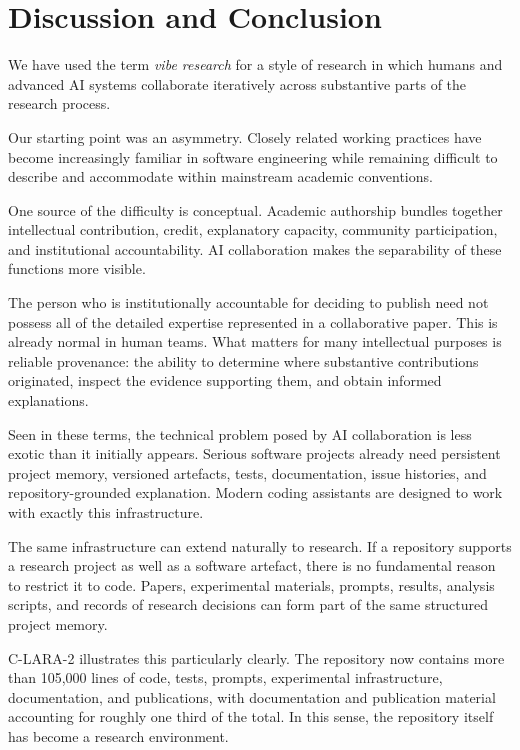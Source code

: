 \section{Discussion and Conclusion}

We have used the term \emph{vibe research} for a style of research in which humans and advanced AI systems collaborate iteratively across substantive parts of the research process.

Our starting point was an asymmetry. Closely related working practices have become increasingly familiar in software engineering while remaining difficult to describe and accommodate within mainstream academic conventions.

One source of the difficulty is conceptual. Academic authorship bundles together intellectual contribution, credit, explanatory capacity, community participation, and institutional accountability. AI collaboration makes the separability of these functions more visible.

The person who is institutionally accountable for deciding to publish need not possess all of the detailed expertise represented in a collaborative paper. This is already normal in human teams. What matters for many intellectual purposes is reliable provenance: the ability to determine where substantive contributions originated, inspect the evidence supporting them, and obtain informed explanations.

Seen in these terms, the technical problem posed by AI collaboration is less exotic than it initially appears. Serious software projects already need persistent project memory, versioned artefacts, tests, documentation, issue histories, and repository-grounded explanation. Modern coding assistants are designed to work with exactly this infrastructure.

The same infrastructure can extend naturally to research. If a repository supports a research project as well as a software artefact, there is no fundamental reason to restrict it to code. Papers, experimental materials, prompts, results, analysis scripts, and records of research decisions can form part of the same structured project memory.

C-LARA-2 illustrates this particularly clearly. The repository now contains more than 105,000 lines of code, tests, prompts, experimental infrastructure, documentation, and publications, with documentation and publication material accounting for roughly one third of the total. In this sense, the repository itself has become a research environment.

